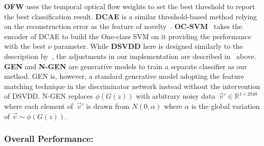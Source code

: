 \documentclass[letterpaper]{article} %
\begin{document}
\textbf{OFW} uses the temporal optical flow weights to set the best
threshold to report the best classification result. \textbf{DCAE} is a
similar threshold-based method relying on the reconstruction error as
the feature of novelty~\citep{KWWBKA19}. \textbf{OC-SVM}~\citep{SPSSW01}
takes the encoder of DCAE to build the One-class SVM on it providing the
performance with the best $\nu$ parameter. While \textbf{DSVDD} here is
designed similarly to the description by~\citet{RVGDSBMK18}, the
adjustments in our implementation are described
in~ above. \textbf{GEN} and
\textbf{\mbox{N-GEN}}
are generative models to train a separate classifier as our method. GEN
is, however, a standard generative model adopting the feature matching
technique in the discriminator network instead without the intervention
of DSVDD. \mbox{N-GEN} replaces $\phi(G(z))$ with arbitrary noisy
data~$\vec{v}'\in\mathbb{R}^{1\times2048}$ where each element
of~$\vec{v}'$ is drawn from $\mathit{N}(0, \alpha)$ where $\alpha$ is
the global variation of $\vec{v}\sim\phi(G(z))$.

\subsubsection{Overall Performance:}
\label{sec:overall_performance}
\end{document}
